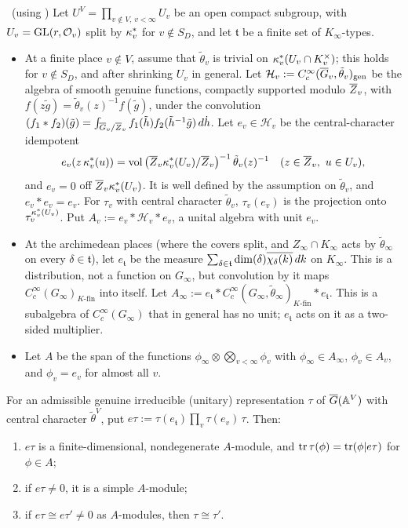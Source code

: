\begin{lemma}\label{I:lem:corner}\ (using \Ev)
Let $U^V=\prod_{v\notin V,\,v<\infty}U_v$ be an open compact subgroup, with $U_v=\mathrm{GL}(r,\mathcal{O}_v)$ split by $\kappa^{*}_v$ for $v\notin S_D$, and let $\mathfrak t$ be a finite set of $K_\infty$-types.
\begin{itemize}
\item At a finite place $v\notin V$, assume that $\tilde\theta_v$ is trivial on $\kappa^{*}_v(U_v\cap K_v^\times)$; this holds for $v\notin S_D$, and after shrinking $U_v$ in general. Let $\mathcal H_v:=C_c^\infty(\overline{G}_v,\tilde\theta_v)_{\mathrm{gen}}$ be the algebra of smooth genuine functions, compactly supported modulo $\overline{Z}_v$, with $f(z\tilde g)=\tilde\theta_v(z)^{-1}f(\tilde g)$, under the convolution $(f_1*f_2)(\tilde g)=\int_{\overline{G}_v/\overline{Z}_v}f_1(\tilde h)f_2(\tilde h^{-1}\tilde g)\,d\dot h$. Let $e_v\in\mathcal H_v$ be the central-character idempotent
\[ e_v(z\,\ks_v(u))=\vol\big(\Zb_v\ks_v(U_v)/\Zb_v\big)^{-1}\,\tilde\theta_v(z)^{-1}\quad(z\in\Zb_v,\ u\in U_v), \]
and $e_v=0$ off $\overline{Z}_v\kappa^{*}_v(U_v)$.
It is well defined by the assumption on $\tilde\theta_v$, and $e_v*e_v=e_v$. For $\tau_v$ with central character $\tilde\theta_v$, $\tau_v(e_v)$ is the projection onto $\tau_v^{\kappa^{*}_v(U_v)}$. Put $A_v:=e_v*\mathcal H_v*e_v$, a unital algebra with unit $e_v$.
\item At the archimedean places (where the covers split, and $Z_\infty\cap K_\infty$ acts by $\tilde\theta_\infty$ on every $\delta\in\mathfrak t$), let $e_{\mathfrak t}$ be the measure $\sum_{\delta\in\mathfrak t}\dim(\delta)\overline{\chi_\delta(k)}\,dk$ on $K_\infty$. This is a distribution, not a function on $G_\infty$, but convolution by it maps $C_c^\infty(G_\infty)_{K\text{-fin}}$ into itself. Let $A_\infty:=e_{\mathfrak t}*C_c^\infty(G_\infty,\tilde\theta_\infty)_{K\text{-fin}}*e_{\mathfrak t}$. This is a subalgebra of $C_c^\infty(G_\infty)$ that in general has no unit; $e_{\mathfrak t}$ acts on it as a two-sided multiplier.
\item Let $A$ be the span of the functions $\phi_\infty\otimes\bigotimes_{v<\infty}\phi_v$ with $\phi_\infty\in A_\infty$, $\phi_v\in A_v$, and $\phi_v=e_v$ for almost all $v$.
\end{itemize}
For an admissible genuine irreducible (unitary) representation $\tau$ of $\overline{G}(\mathbb{A}^V)$ with central character $\tilde\theta^V$, put $e\tau:=\tau(e_{\mathfrak t})\prod_v\tau(e_v)\,\tau$. Then:
\begin{enumerate}[label=(\alph*)]
\item $e\tau$ is a finite-dimensional, nondegenerate $A$-module, and $\operatorname{tr}\tau(\phi)=\operatorname{tr}(\phi|e\tau)$ for $\phi\in A$;
\item if $e\tau\ne0$, it is a simple $A$-module;
\item if $e\tau\cong e\tau'\ne0$ as $A$-modules, then $\tau\cong\tau'$.
\end{enumerate}
\end{lemma}
